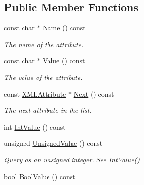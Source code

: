 \subsection*{Public Member Functions}
\begin{DoxyCompactItemize}
\item 
\hypertarget{classtinyxml2_1_1_x_m_l_attribute_a631990ac0d176e38fc291b17b295a62d}{}const char $\ast$ \hyperlink{classtinyxml2_1_1_x_m_l_attribute_a631990ac0d176e38fc291b17b295a62d}{Name} () const \label{classtinyxml2_1_1_x_m_l_attribute_a631990ac0d176e38fc291b17b295a62d}

\begin{DoxyCompactList}\small\item\em The name of the attribute. \end{DoxyCompactList}\item 
\hypertarget{classtinyxml2_1_1_x_m_l_attribute_adf884db24f469f8a99a14ae786d4ddd7}{}const char $\ast$ \hyperlink{classtinyxml2_1_1_x_m_l_attribute_adf884db24f469f8a99a14ae786d4ddd7}{Value} () const \label{classtinyxml2_1_1_x_m_l_attribute_adf884db24f469f8a99a14ae786d4ddd7}

\begin{DoxyCompactList}\small\item\em The value of the attribute. \end{DoxyCompactList}\item 
\hypertarget{classtinyxml2_1_1_x_m_l_attribute_a7fd852d6185af90361ec1bc9a7681ad6}{}const \hyperlink{classtinyxml2_1_1_x_m_l_attribute}{X\+M\+L\+Attribute} $\ast$ \hyperlink{classtinyxml2_1_1_x_m_l_attribute_a7fd852d6185af90361ec1bc9a7681ad6}{Next} () const \label{classtinyxml2_1_1_x_m_l_attribute_a7fd852d6185af90361ec1bc9a7681ad6}

\begin{DoxyCompactList}\small\item\em The next attribute in the list. \end{DoxyCompactList}\item 
int \hyperlink{classtinyxml2_1_1_x_m_l_attribute_a949d02a5888092cc68c1e29185301863}{Int\+Value} () const 
\item 
\hypertarget{classtinyxml2_1_1_x_m_l_attribute_a4c7a179907836a136d1ce5acbe53389d}{}unsigned \hyperlink{classtinyxml2_1_1_x_m_l_attribute_a4c7a179907836a136d1ce5acbe53389d}{Unsigned\+Value} () const \label{classtinyxml2_1_1_x_m_l_attribute_a4c7a179907836a136d1ce5acbe53389d}

\begin{DoxyCompactList}\small\item\em Query as an unsigned integer. See \hyperlink{classtinyxml2_1_1_x_m_l_attribute_a949d02a5888092cc68c1e29185301863}{Int\+Value()} \end{DoxyCompactList}\item 
\hypertarget{classtinyxml2_1_1_x_m_l_attribute_afb444b7a12527f836aa161b54b2f7ce7}{}bool \hyperlink{classtinyxml2_1_1_x_m_l_attribute_afb444b7a12527f836aa161b54b2f7ce7}{Bool\+Value} () const \label{classtinyxml2_1_1_x_m_l_attribute_afb444b7a12527f836aa161b54b2f7ce7}


\end{DoxyCompactItemize}

